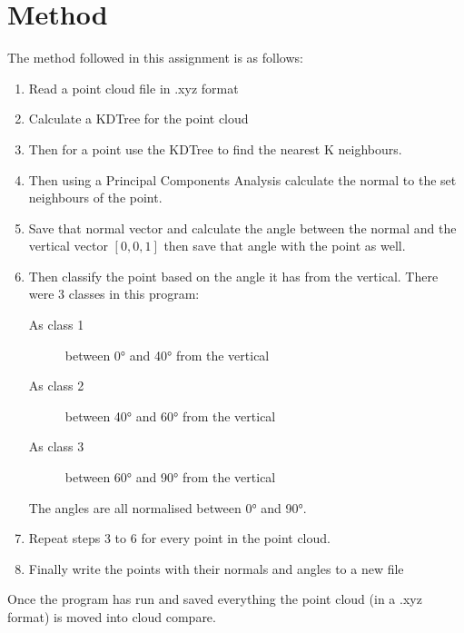 \documentclass[11pt,a4paper]{article}
\begin{document}
	\newpage
	\section{Method}
	
	The method followed in this assignment is as follows:
	
	\begin{enumerate}
	\item Read a point cloud file in .xyz format
	
	\item Calculate a KDTree for the point cloud
	
	\item Then for a point use the KDTree to find the nearest K neighbours.
	
	\item Then using a Principal Components Analysis calculate the normal to the set neighbours of the point.
	
	\item Save that normal vector and calculate the angle between the normal and the vertical vector $[0,0,1]$ then save that angle with the point as well.
	
	\item Then classify the point based on the angle it has from the vertical. There were 3 classes in this program:
	
	\begin{description}
	 \item[As class 1] between 0\si{\degree} and 40\si{\degree} from the vertical
	 \item[As class 2] between 40\si{\degree} and 60\si{\degree} from the vertical
	 \item[As class 3] between 60\si{\degree} and 90\si{\degree} from the vertical
	\end{description}
	
	The angles are all normalised between 0\si{\degree} and 90\si{\degree}.
	
	\item Repeat steps 3 to 6 for every point in the point cloud.
	
	\item Finally write the points with their normals and angles to a new file
	
	\end{enumerate}
	
	Once the program has run and saved everything the point cloud (in a .xyz format) is moved into cloud compare.
	
\end{document}

